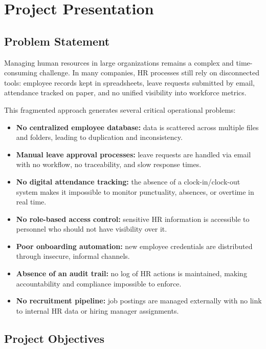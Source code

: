 \documentclass[12pt,a4paper]{report}
\begin{document}
\section{Project Presentation}

\subsection{Problem Statement}

Managing human resources in large organizations remains a complex and time-consuming
challenge. In many companies, HR processes still rely on disconnected tools: employee
records kept in spreadsheets, leave requests submitted by email, attendance tracked on
paper, and no unified visibility into workforce metrics.

This fragmented approach generates several critical operational problems:

\begin{itemize}
  \item \textbf{No centralized employee database:} data is scattered across multiple files
    and folders, leading to duplication and inconsistency.
  \item \textbf{Manual leave approval processes:} leave requests are handled via email
    with no workflow, no traceability, and slow response times.
  \item \textbf{No digital attendance tracking:} the absence of a clock-in/clock-out
    system makes it impossible to monitor punctuality, absences, or overtime in real time.
  \item \textbf{No role-based access control:} sensitive HR information is accessible to
    personnel who should not have visibility over it.
  \item \textbf{Poor onboarding automation:} new employee credentials are distributed
    through insecure, informal channels.
  \item \textbf{Absence of an audit trail:} no log of HR actions is maintained, making
    accountability and compliance impossible to enforce.
  \item \textbf{No recruitment pipeline:} job postings are managed externally with no
    link to internal HR data or hiring manager assignments.
\end{itemize}

\subsection{Project Objectives}
\end{document}
